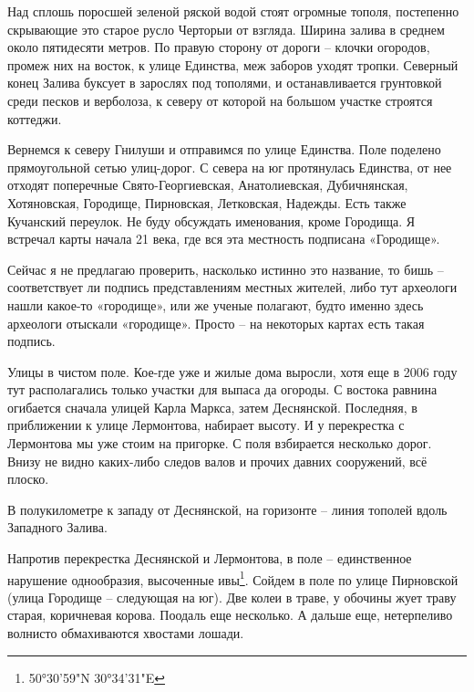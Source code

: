 Над сплошь поросшей зеленой ряской водой стоят огромные тополя, постепенно скрывающие это старое русло Черторыи от взгляда. Ширина залива в среднем около пятидесяти метров. По правую сторону от дороги – клочки огородов, промеж них на восток, к улице Единства, меж заборов уходят тропки. Северный конец Залива буксует в зарослях под тополями, и останавливается грунтовкой среди песков и верболоза, к северу от которой на большом участке строятся коттеджи.

Вернемся к северу Гнилуши и отправимся по улице Единства. Поле поделено прямоугольной сетью улиц-дорог. С севера на юг протянулась Единства, от нее отходят поперечные Свято-Георгиевская, Анатолиевская, Дубичнянская, Хотяновская, Городище, Пирновская, Летковская, Надежды. Есть также Кучанский переулок. Не буду обсуждать именования, кроме Городища. Я встречал карты начала 21 века, где вся эта местность подписана «Городище».

Сейчас я не предлагаю проверить, насколько истинно это название, то бишь – соответствует ли подпись представлениям местных жителей, либо тут археологи нашли какое-то «городище», или же ученые полагают, будто именно здесь археологи отыскали «городище». Просто – на некоторых картах есть такая подпись.

Улицы в чистом поле. Кое-где уже и жилые дома выросли, хотя еще в 2006 году тут располагались только участки для выпаса да огороды. С востока равнина огибается сначала улицей Карла Маркса, затем Деснянской. Последняя, в приближении к улице Лермонтова, набирает высоту. И у перекрестка с Лермонтова мы уже стоим на пригорке. С поля взбирается несколько дорог. Внизу не видно каких-либо следов валов и прочих давних сооружений, всё плоско. 


В полукилометре к западу от Деснянской, на горизонте – линия тополей вдоль Западного Залива.

Напротив перекрестка Деснянской и Лермонтова, в поле – единственное нарушение однообразия, высоченные ивы\footnote{50°30'59"N 30°34'31"E}. Сойдем в поле по улице Пирновской (улица Городище – следующая на юг). Две колеи в траве, у обочины жует траву старая, коричневая корова. Поодаль еще несколько. А дальше еще, нетерпеливо волнисто обмахиваются хвостами лошади.

